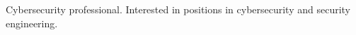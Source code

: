 

\begin{cvparagraph}

Cybersecurity professional. Interested in positions in cybersecurity and security engineering.

\end{cvparagraph}
